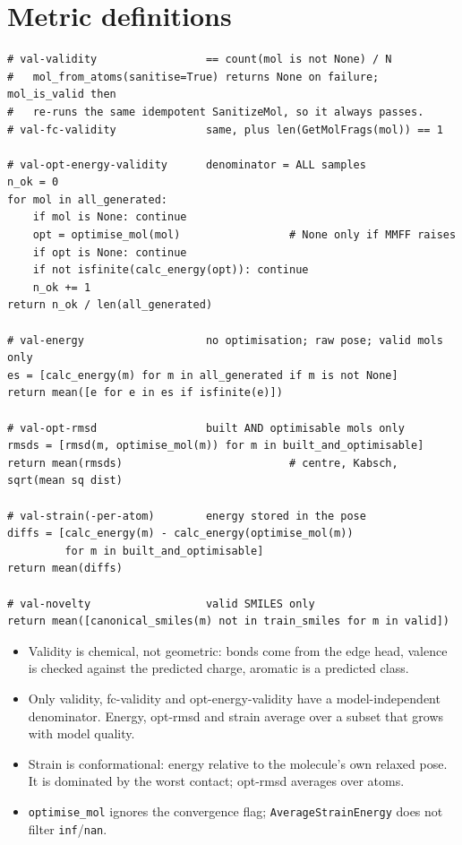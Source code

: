 \documentclass[11pt,a4paper]{article}
\newcommand{\code}[1]{\texttt{#1}}
\begin{document}
\appendix
\section{Metric definitions}\label{app:metrics}

\begin{lstlisting}
# val-validity                 == count(mol is not None) / N
#   mol_from_atoms(sanitise=True) returns None on failure; mol_is_valid then
#   re-runs the same idempotent SanitizeMol, so it always passes.
# val-fc-validity              same, plus len(GetMolFrags(mol)) == 1

# val-opt-energy-validity      denominator = ALL samples
n_ok = 0
for mol in all_generated:
    if mol is None: continue
    opt = optimise_mol(mol)                 # None only if MMFF raises
    if opt is None: continue
    if not isfinite(calc_energy(opt)): continue
    n_ok += 1
return n_ok / len(all_generated)

# val-energy                   no optimisation; raw pose; valid mols only
es = [calc_energy(m) for m in all_generated if m is not None]
return mean([e for e in es if isfinite(e)])

# val-opt-rmsd                 built AND optimisable mols only
rmsds = [rmsd(m, optimise_mol(m)) for m in built_and_optimisable]
return mean(rmsds)                          # centre, Kabsch, sqrt(mean sq dist)

# val-strain(-per-atom)        energy stored in the pose
diffs = [calc_energy(m) - calc_energy(optimise_mol(m))
         for m in built_and_optimisable]
return mean(diffs)

# val-novelty                  valid SMILES only
return mean([canonical_smiles(m) not in train_smiles for m in valid])
\end{lstlisting}

\begin{itemize}
  \item Validity is chemical, not geometric: bonds come from the edge head, valence is
        checked against the predicted charge, aromatic is a predicted class.
  \item Only validity, fc-validity and opt-energy-validity have a model-independent
        denominator. Energy, opt-rmsd and strain average over a subset that grows with
        model quality.
  \item Strain is conformational: energy relative to the molecule's own relaxed pose.
        It is dominated by the worst contact; opt-rmsd averages over atoms.
  \item \code{optimise\_mol} ignores the convergence flag; \code{AverageStrainEnergy}
        does not filter \code{inf}/\code{nan}.
\end{itemize}
\end{document}
